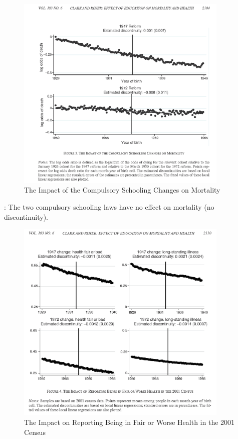             \begin{figure}[H]
                \centering
                \includegraphics[width=4in]{images/ch3/37.png}
                \caption{The Impact of the Compulsory Schooling Changes on Mortality}
            \end{figure}

            : The two compulsory schooling laws have no effect on mortality (no discontinuity).
     
            \begin{figure}[H]
                \centering
                \includegraphics[width=4in]{images/ch3/38.png}
                \caption{The Impact on Reporting Being in Fair or Worse Health in the 2001 Census}
            \end{figure}  
            
